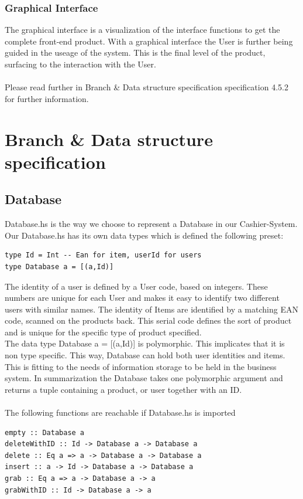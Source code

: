\documentclass[11pt]{article}
\begin{document}
\subsubsection{Graphical Interface}
The graphical interface is a visualization of the interface functions to get the complete front-end product. With a graphical interface the User is further being guided in the useage of the system. This is the final level of the product, surfacing to the interaction with the User.
\\\\
Please read further in Branch \& Data structure specification specification 4.5.2 for further information.
\newpage
\section{Branch \& Data structure specification}
\subsection{Database}
Database.hs is the way we choose to represent a Database in our Cashier-System. Our Database.hs has its own data types which is defined the following preset:
\begin{lstlisting}
type Id = Int -- Ean for item, userId for users
type Database a = [(a,Id)]
\end{lstlisting}

The identity of a user is defined by a User code, based on integers. These numbers are unique for each User and makes  it easy to identify two different users with similar names.
The identity of Items are identified by a matching EAN code, scanned on the products back. This serial code defines the sort of product and is unique for the specific type of product specified.
\\
The data type Database a = [(a,Id)]  is polymorphic. This implicates that it is non type specific.  This way, Database can hold both user identities and items. This is fitting to the needs of information storage to be held in the business system. In summarization the Database takes one polymorphic argument and returns a tuple containing a product, or user together with an ID.
\\\\
The following functions are reachable if Database.hs is imported
\begin{lstlisting}
empty :: Database a
deleteWithID :: Id -> Database a -> Database a
delete :: Eq a => a -> Database a -> Database a
insert :: a -> Id -> Database a -> Database a
grab :: Eq a => a -> Database a -> a
grabWithID :: Id -> Database a -> a
\end{lstlisting}
\end{document}
